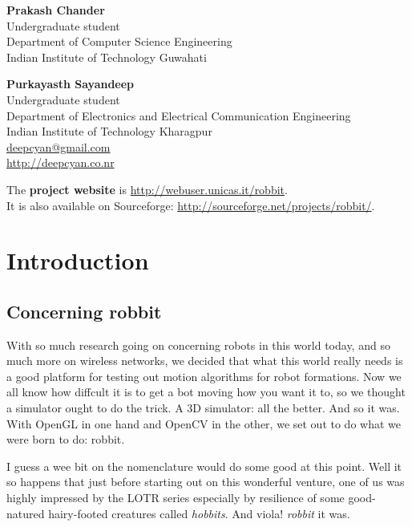\documentclass[10pt,a4paper]{article}
\newcommand{\ns}{\vspace{6pt}\noindent}
\begin{document}
\ns
{\bf Prakash Chander} \\
Undergraduate student \\
Department of Computer Science Engineering \\
Indian Institute of Technology Guwahati

\ns
{\bf Purkayasth Sayandeep} \\
Undergraduate student \\
Department of Electronics and Electrical Communication Engineering \\
Indian Institute of Technology Kharagpur \\
\href{mailto:deepcyan@gmail.com}{deepcyan@gmail.com} \\
\href{http://deepcyan.co.nr}{http://deepcyan.co.nr}

\vspace{0.7in}
\noindent The \textbf{project website} is \href{http://webuser.unicas.it/robbit}{http://webuser.unicas.it/robbit}. \\
It is also available on Sourceforge: \href{http://sourceforge.net/projects/robbit/}{http://sourceforge.net/projects/robbit/}.

\newpage

\tableofcontents 
\newpage


\section{Introduction}
\subsection{Concerning robbit}
With so much research going on concerning robots in this world today, and so much more on wireless networks, we decided that what this world really needs is a good platform for testing out motion algorithms for robot formations. Now we all know how diffcult it is to get a bot moving how you want it to, so we thought a simulator ought to do the trick. A 3D simulator: all the better. And so it was. With OpenGL in one hand and OpenCV in the other, we set out to do what we were born to do: robbit.

\ns
I guess a wee bit on the nomenclature would do some good at this point. Well it so happens that just before starting out on this wonderful venture, one of us was highly impressed by the LOTR series especially by resilience of some good-natured hairy-footed creatures called {\sl hobbits}. And viola! {\sl robbit} it was.
\end{document}
